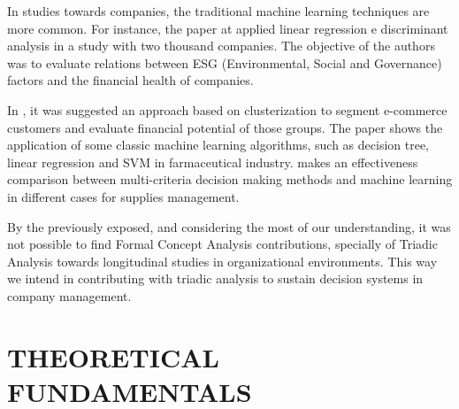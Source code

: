 \documentclass[a4paper,twoside]{article}
\begin{document}
In studies towards companies, the traditional machine learning techniques are more common. For instance, the paper at \cite{lima:24} applied linear regression e discriminant analysis in a study with two thousand companies. The objective of the authors was to evaluate relations between ESG (Environmental, Social and Governance) factors and the financial health of companies.

In \cite{falqueto:22}, it was suggested an approach based on clusterization to segment e-commerce customers and evaluate financial potential of those groups. The paper \cite{campos:21} shows the application of some classic machine learning algorithms, such as decision tree, linear regression and SVM in farmaceutical industry. \cite{vidal:20} makes an effectiveness comparison between multi-criteria decision making methods and machine learning in different cases for supplies management.

By the previously exposed, and considering the most of our understanding, it was not possible to find Formal Concept Analysis contributions, specially of Triadic Analysis towards longitudinal studies in organizational environments. This way we intend in contributing with triadic analysis to sustain decision systems in company management.

\section{\uppercase{Theoretical Fundamentals}}
\end{document}
